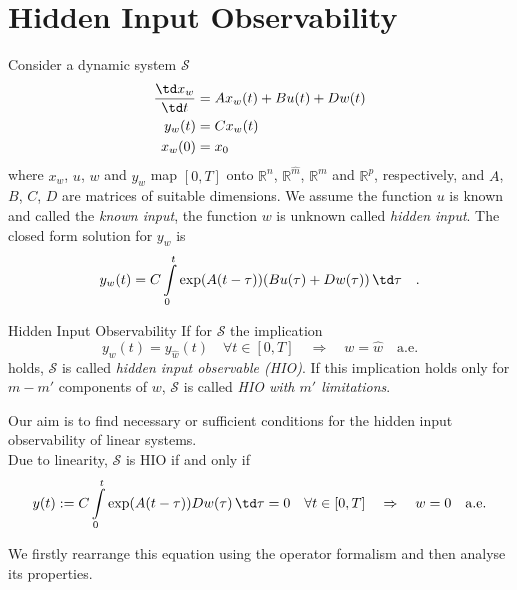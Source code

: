 \section{Hidden Input Observability}
	Consider a dynamic system $\mathcal{S}$
	\begin{align}
	\frac{\td x_w}{\td t} &= Ax_w(t) + Bu(t) + Dw(t) \\
	y_w(t) &= Cx_w(t) \\
	x_w(0) &= x_0
	\end{align}
	where $x_w$, $u$, $w$ and $y_w$ map $[0,T]$ onto $\mathbb{R}^n$, 
	$\mathbb{R}^{\hat{m}}$, $\mathbb{R}^m$ and $\mathbb{R}^p$, respectively, and 
	$A$, $B$, $C$, $D$ are matrices of suitable dimensions. We assume the function $u$ is
	known and called the \textit{known input}, the function $w$ is unknown called 
	 \textit{hidden input}. The closed form solution for $y_w$ is
	\begin{equation}
	y_w(t) = C \int\limits_0^t \exp(A(t-\tau)) (Bu(\tau) + Dw(\tau) ) \, \td 
	\tau \quad .
	\end{equation}

\begin{definition}{Hidden Input Observability}{}
If for $\mathcal{S}$ the implication
\begin{equation}
y_{w}(t) = y_{\hat{w}}(t) \quad \forall t\in [0,T]
\quad \Rightarrow \quad 
 w = \hat{w} \quad \text{a.e.}
\end{equation}
holds, $\mathcal{S}$ is called \textit{hidden input observable (HIO)}. If this 
implication holds only for 
$m-m'$ components of $w$, $\mathcal{S}$ is 
called \textit{HIO with $m'$ limitations}.
\end{definition}

Our aim is to find necessary or sufficient conditions for the hidden input observability 
of linear systems.\\

Due to linearity, $\mathcal{S}$ is HIO if and only if
\begin{equation}
y(t):=C\int\limits_0^t \exp(A(t-\tau))Dw(\tau)\,\td\tau = 0 \quad 
\forall t\in[0,T] \quad \Rightarrow \quad 
w = 0 \quad \text{a.e.} \label{eq:HIO:y}
\end{equation}

We firstly rearrange this equation using the operator formalism and then a\-na\-lyse its 
properties.

\clearpage
